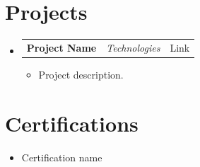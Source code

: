 \documentclass[a4paper,11pt]{article}
\makeatletter
\newcommand{\resumeItem}[1]{
  \item\small{#1}
}
\newcommand{\resumeItemListStart}{\begin{itemize}[rightmargin=0.11in]}
\newcommand{\resumeItemListEnd}{\end{itemize}}
\newcommand{\resumeTrioHeading}[3]{
  \item\small{
    \begin{tabular*}{0.96\textwidth}[t]{
      l@{\extracolsep{\fill}}c@{\extracolsep{\fill}}r
    }
      \textbf{#1} & \textit{#2} & #3
    \end{tabular*}
  }
}
\newcommand{\resumeHeadingListStart}{
  \begin{itemize}[leftmargin=0.15in, label={}]
}
\newcommand{\resumeHeadingListEnd}{\end{itemize}}
\makeatother
\begin{document}
\section{Projects}
  \resumeHeadingListStart{}
    \resumeTrioHeading{Project Name}{Technologies}{Link}
      \resumeItemListStart{}
        \resumeItem{Project description.}
      \resumeItemListEnd{}
  \resumeHeadingListEnd{}


\section{Certifications}
  \resumeItemListStart{}
    \resumeItem{Certification name}
  \resumeItemListEnd{}
\end{document}

